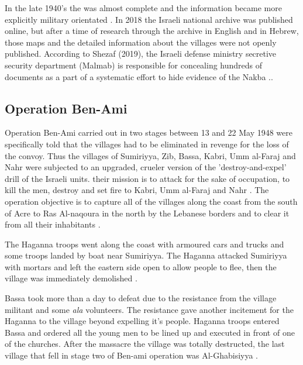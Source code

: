 In the late 1940's the  was almost complete and the information became more explicitly military orientated \citep{Pappe2006}. In 2018 the Israeli national archive was published online, but after a time of research through the archive in English and in Hebrew, those maps and the detailed information about the villages were not openly published. According to Shezaf (2019), the Israeli defense ministry secretive security department (Malmab) is responsible for concealing hundreds of documents as a part of a systematic effort to hide evidence of the Nakba \citep{Shezaf2019}.\citep{Shezaf2019}.


\subsection{Operation Ben-Ami}

Operation Ben-Ami carried out in two stages between 13 and 22 May 1948
were specifically told that the villages had to be eliminated in revenge for the
loss of the convoy. Thus the villages of Sumiriyya, Zib, Bassa, Kabri, Umm
al-Faraj and Nahr were subjected to an upgraded, crueler version of
the 'destroy-and-expel' drill of the Israeli units. their mission is to attack for
the sake of occupation, to kill the men, destroy and set fire to Kabri, Umm
al-Faraj and Nahr \citep{Pappe2006}. The operation objective is to capture all of the villages along the coast from the south of Acre to Ras Al-naqoura in the north by the Lebanese borders and to clear it from all their inhabitants \citep{Morris2004} \citep{Morris2008}.

The Haganna troops went along the coast with armoured cars and trucks and some troops landed by boat near Sumiriyya. The Haganna  attacked Sumiriyya with mortars and left the eastern side open to allow people to flee, then the village was immediately demolished \citep{Morris2004}\citep{Morris2008}.

Bassa took more than a day to defeat due to the resistance from the village militant and some \textit{\acrfull{ala}} volunteers. The resistance gave another incitement for the Haganna to  the village beyond expelling it's people. Haganna troops entered Bassa and ordered all the young men to be lined up and executed in front of one of the churches. After the massacre the village was totally destructed, the last village that fell in stage two of Ben-ami operation was Al-Ghabisiyya \citep{Morris2004} \citep{Pappe2006}.  



